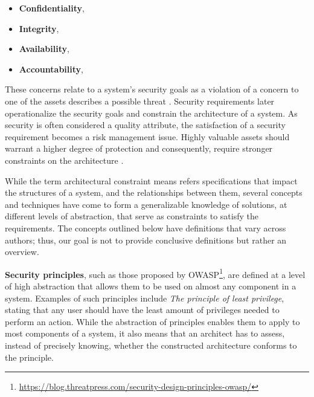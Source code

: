 \begin{itemize}
    \item \textbf{Confidentiality},  \cite{ross_systems_2018}
    \item \textbf{Integrity},  \cite{ross_systems_2018}
    \item \textbf{Availability},  \cite{ross_systems_2018}
    \item \textbf{Accountability},  \cite{ross_systems_2018}
\end{itemize}

These concerns relate to a system's security goals as a violation of a concern to one of the assets describes a possible threat \cite{haley_security_2008}. Security requirements later operationalize the security goals and constrain the architecture of a system. As security is often considered a quality attribute, the satisfaction of a security requirement becomes a risk management issue.  Highly valuable assets should warrant a higher degree of protection and consequently, require stronger constraints on the architecture \cite{broy_software_2007}.

While the term architectural constraint means refers specifications that impact the structures of a system, and the relationships between them, several concepts and techniques have come to form a generalizable knowledge of solutions, at different levels of abstraction, that serve as constraints to satisfy the requirements. The concepts outlined below have definitions that vary across authors; thus, our goal is not to provide conclusive definitions but rather an overview. 

\textbf{Security principles}, such as those proposed by OWASP\footnote{\url{https://blog.threatpress.com/security-design-principles-owasp/}}, are defined at a level of high abstraction that allows them to be used on almost any component in a system. Examples of such principles include \textit{The principle of least privilege}, stating that any user should have the least amount of privileges needed to perform an action. While the abstraction of principles enables them to apply to most components of a system, it also means that an architect has to assess, instead of precisely knowing, whether the constructed architecture conforms to the principle. 

